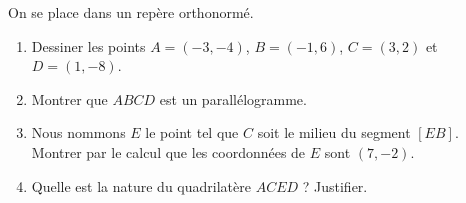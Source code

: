 
\begin{exercice}\label{exoSeconde-0021}

    On se place dans un repère orthonormé\cite{BAIljy}.
    \begin{enumerate}
        \item
            Dessiner les points \( A=(-3,-4)\), \( B=(-1,6)\), \( C=(3,2)\) et \( D=(1,-8)\).
        \item
            Montrer que \( ABCD\) est un parallélogramme.
        \item
            Nous nommons \( E\) le point tel que \( C\) soit le milieu du segment \( [EB]\). Montrer par le calcul que les coordonnées de \( E\) sont \( (7,-2)\).
        \item
            Quelle est la nature du quadrilatère \( ACED\) ? Justifier.
    \end{enumerate}

\end{exercice}
